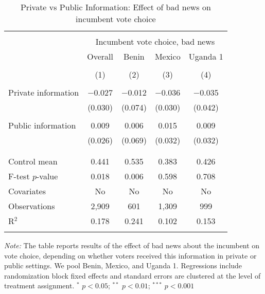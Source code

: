 
\begin{table}[!htbp] \centering 
  \caption{Private vs Public Information: Effect of bad news on incumbent vote choice} 
  \label{pvt_pub_bad} 
\begin{tabular}{@{\extracolsep{5pt}}lcccc} 
\\[-1.8ex]\hline 
\hline \\[-1.8ex] 
 & \multicolumn{4}{c}{Incumbent vote choice, bad news} \\ 
\cline{2-5} 
 & Overall & Benin & Mexico & Uganda 1 \\ 
\\[-1.8ex] & (1) & (2) & (3) & (4)\\ 
\hline \\[-1.8ex] 
 Private information & $-$0.027 & $-$0.012 & $-$0.036 & $-$0.035 \\ 
  & (0.030) & (0.074) & (0.030) & (0.042) \\ 
  & & & & \\ 
 Public information & 0.009 & 0.006 & 0.015 & 0.009 \\ 
  & (0.026) & (0.069) & (0.032) & (0.032) \\ 
  & & & & \\ 
\hline \\[-1.8ex] 
Control mean & 0.441 & 0.535 & 0.383 & 0.426 \\ 
F-test $p$-value & 0.018 & 0.006 & 0.598 & 0.708 \\ 
Covariates & No & No & No & No \\ 
Observations & 2,909 & 601 & 1,309 & 999 \\ 
R$^{2}$ & 0.178 & 0.241 & 0.102 & 0.153 \\ 
\hline 
\hline \\[-1.8ex] 
\end{tabular} 
\begin{flushleft}\textit{Note:} The table reports results of the effect of bad news about the incumbent on vote choice, depending on whether voters received this information in private or public settings. We pool Benin, Mexico, and Uganda 1. Regressions include randomization block fixed effects and standard errors are clustered at the level of treatment assignment. $^*$ $p<0.05$; $^{**}$ $p<0.01$; $^{***}$ $p<0.001$ \end{flushleft}
\end{table} 
